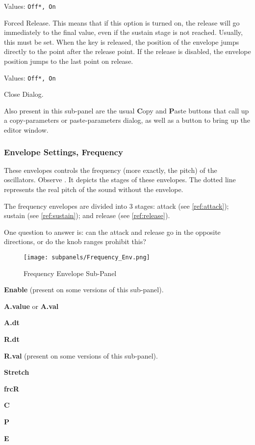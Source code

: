    Values: \texttt{Off*, On}

   Forced Release.
   This means that if this option is turned on, the release will go
   immediately to the final value, even if the sustain stage is not reached.
   Usually, this must be set.
   When the key is released, the position of the envelope jumps directly to
   the point after the release point. If the release is disabled, the
   envelope position jumps to the last point on release.

   Values: \texttt{Off*, On}

   Close Dialog.

   Also present in this sub-panel are the usual \textbf{C}opy
   and \textbf{P}aste buttons that call up a copy-parameters or
   paste-parameters dialog, as well as a button
   to bring up the editor window.

\subsubsection{Envelope Settings, Frequency}
\label{subsubsec:envelope_settings_for_frequency}

   These envelopes controls the frequency (more exactly, the pitch) of the
   oscillators.
   Observe .
   It depicts the stages of these envelopes.
   The dotted line represents the real pitch of the sound without the envelope.

   The frequency envelopes are divided into 3 stages:
   attack (see \ref{ref:attack});
   sustain (see \ref{ref:sustain});
   and
   release (see \ref{ref:release}).

   One question to answer is:
   can the attack and release go in the opposite directions, or do the knob
   ranges prohibit this?

\begin{figure}[H]
   \centering
   \texttt{[image: subpanels/Frequency\_Env.png]}
   \caption[Frequency Envelope Sub-Panel]{Frequency Envelope Sub-Panel}
   \label{fig:frequency_env}
\end{figure}

   \begin{enumber}
      \item \textbf{Enable} (present on some versions of this sub-panel).
      \item \textbf{A.value} or \textbf{A.val}
      \item \textbf{A.dt}
      \item \textbf{R.dt}
      \item \textbf{R.val} (present on some versions of this sub-panel).
      \item \textbf{Stretch}
      \item \textbf{frcR}
      \item \textbf{C}
      \item \textbf{P}
      \item \textbf{E}
   \end{enumber}

